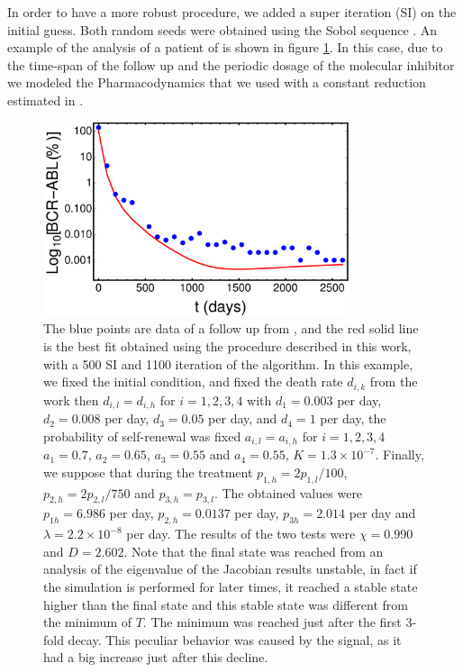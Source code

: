 \documentclass[a4paper,10pt]{article}
\begin{document}
In order to have a more robust procedure, we added a super iteration (SI) on the initial guess. 
Both random seeds were obtained using the Sobol sequence \cite{bergstra2012random}.
An example of the analysis of a patient of \cite{michor2005} 
is shown in figure \ref{fig:data-analysis}.
In this case, due to the time-span of 
the follow up and the periodic dosage of the molecular inhibitor
we modeled the Pharmacodynamics that we used with a constant reduction estimated in \cite{michor2005}.
\begin{figure}
\centering
\includegraphics[width=9cm ]
{analisi-paziente1.pdf}
\caption{The blue points are data of a follow up from \cite{michor2005}, and the red solid line is the best fit obtained using the procedure described in this work, with a 500 SI and 1100 iteration of 
the algorithm.
In this example, we fixed the initial condition, and fixed the death rate $d_{i,k}$ from the work \cite{michor2005} then $d_{i,l}=d_{i,h}$ for $i=1,2,3,4$ with $d_1=0.003$ per day, $d_2=0.008$ per day,
$d_3=0.05$ per day, and $d_4=1$ per day,
the probability of self-renewal was fixed $ a_{i,l}=a_{i,h}$ for $i=1,2,3,4$ $a_1=0.7$, $a_2=0.65$, $a_{3}=0.55$ and $a_{4}=0.55$, $K=1.3 \times 10^{-7}$. Finally, we suppose that during the treatment 
$p_{1,h}=2p_{1,l}/100$, $p_{2,h}=2p_{2,l}/750$ and $p_{3,h}=p_{3,l}$. The obtained values were $p_{1h}=6.986$ per day, $p_{2,h}=0.0137$ per day, $p_{3h}=2.014$ per day and
$\lambda= 2.2 \times 10^{-8}$ per day. The results of the two tests were $\chi=0.990$ and $D=2.602$. Note that the final state was reached from an analysis of the eigenvalue of the Jacobian results
unstable, in fact if the simulation is performed for later times, it reached a stable state higher than the final state and this stable state 
was different from the minimum of $T$. The minimum was reached just after the first 3-fold decay. 
This peculiar behavior was caused by the signal, as it had a big increase just after this decline.}
\label{fig:data-analysis}
\end{figure}
\FloatBarrier
\end{document}
